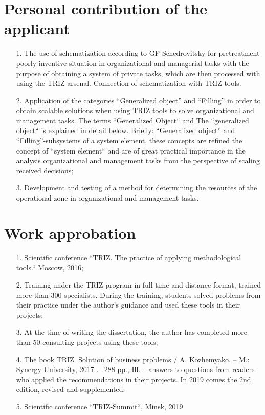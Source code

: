 \section{Personal contribution of the applicant}
\begin{itemize}
\item[1.] The use of schematization according to GP Schedrovitsky for
  pretreatment poorly inventive situation in organizational and managerial
  tasks with the purpose of obtaining a system of private tasks, which are
  then processed with using the TRIZ arsenal. Connection of schematization
  with TRIZ tools.
\item[2.] Application of the categories “Generalized object” and “Filling” in
  order to obtain scalable solutions when using TRIZ tools to solve
  organizational and management tasks. The terms “Generalized Object“ and The
  “generalized object“ is explained in detail below. Briefly: “Generalized
  object” and “Filling”-subsystems of a system element, these concepts are
  refined the concept of “system element“ and are of great practical
  importance in the analysis organizational and management tasks from the
  perspective of scaling received decisions;
\item[3.] Development and testing of a method for determining the resources of
  the operational zone in organizational and management tasks.
\end{itemize}
\section{Work approbation}
\begin{itemize}
\item[1.] Scientific conference “TRIZ. The practice of applying methodological
  tools.“ Moscow, 2016;
\item[2.] Training under the TRIZ program in full-time and distance format,
  trained more than 300 specialists. During the training, students solved
  problems from their practice under the author’s guidance and used these
  tools in their projects;
\item[3.] At the time of writing the dissertation, the author has completed
  more than 50 consulting projects using these tools;
\item[4.] The book TRIZ. Solution of business problems / A. Kozhemyako. -- M.:
  Synergy University, 2017 .-- 288 pp., Ill. -- answers to questions from
  readers who applied the recommendations in their projects. In 2019 comes the
  2nd edition, revised and supplemented.
\item[5.] Scientific conference “TRIZ-Summit“, Minsk, 2019
\end{itemize}
